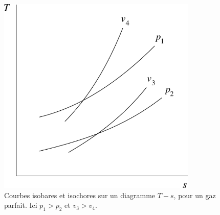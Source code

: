 		\begin{figure}
			\begin{center}
				\includegraphics[width=9.5cm]{images/ts_gp_isobares_isochores.png}
			\end{center}
			\caption{Courbes isobares et isochores sur un diagramme $T-s$, pour un gaz parfait.
		Ici $p_1>p_2$ et $v_3>v_4$.}
			\label{fig_ts_gp_isobares_isochores}
		\end{figure}


